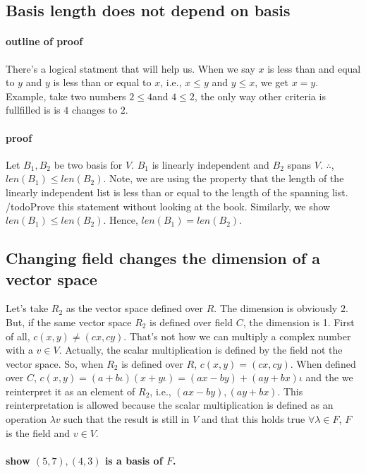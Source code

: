 \documentclass{report}
\begin{document}
\subsection{Basis length does not depend on basis}

\paragraph{outline of proof}

There's a logical statment that will help us. When we say $x$ is less than and equal to $y$ and $y$ is less than or equal to $x$, i.e., $x \leq y$ and $y \leq x$, we get $x=y$. Example, take two numbers $2 \leq 4$and $4 \leq 2$, the only way other criteria is fullfilled is is $4$ changes to $2 $. 
\paragraph{proof} 

Let $B_1,B_2$ be two basis for $V$. $B_1$ is linearly independent and $B_2$ spans $V$. $\therefore$, $len(B_1) \leq len(B_2)$. Note, we are using the property that the length of the linearly independent list is less than or equal to the length of the spanning list. /todo{Prove this statement without looking at the book}. Similarly, we show $len(B_1) \leq len(B_2)$. Hence, $len(B_1) = len(B_2)$. 


\subsection{Changing field changes the dimension of a vector space}
Let's take $R_2$ as the vector space defined over $R$. The dimension is obviously $2$. But, if the same vector space $R_2$ is defined over field $C$, the dimension is 1. First of all, $c(x,y) \neq (cx,cy)$. That's not how we can multiply a complex number with a $v \in V$. Actually, the scalar multiplication is defined by the field not the vector space. So, when $R_2$ is defined over $R$, $c(x,y) = (cx,cy)$. When defined over $C$, $c(x,y) = (a+b\iota) (x + y\iota) = (ax-by) + (ay+bx)\iota$ and the we reinterpret it as an element of $R_2$, i.e., $(ax-by),(ay+bx)$. This reinterpretation is allowed because the scalar multiplication is defined as an operation $\lambda v$ such that the result is still in  $V$ and that this holds true $\forall \lambda \in F$, $F$ is the field and  $v \in V$.

\paragraph{show $(5,7),(4,3)$ is a basis of $F$.} 
\end{document}
